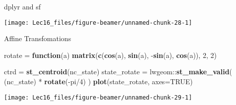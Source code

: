 \documentclass[11pt,ignorenonframetext,]{beamer}
\newenvironment{Shaded}{}{}
\newcommand{\ControlFlowTok}[1]{\textcolor[rgb]{0.00,0.44,0.13}{\textbf{#1}}}
\newcommand{\DataTypeTok}[1]{\textcolor[rgb]{0.56,0.13,0.00}{#1}}
\newcommand{\DecValTok}[1]{\textcolor[rgb]{0.25,0.63,0.44}{#1}}
\newcommand{\KeywordTok}[1]{\textcolor[rgb]{0.00,0.44,0.13}{\textbf{#1}}}
\newcommand{\NormalTok}[1]{#1}
\newcommand{\OperatorTok}[1]{\textcolor[rgb]{0.40,0.40,0.40}{#1}}
\newcommand{\OtherTok}[1]{\textcolor[rgb]{0.00,0.44,0.13}{#1}}
\newcommand{\StringTok}[1]{\textcolor[rgb]{0.25,0.44,0.63}{#1}}
\let\oldShaded\Shaded
\let\endoldShaded\endShaded
\renewenvironment{Shaded}{\footnotesize\begin{spacing}{0.9}\oldShaded}{\endoldShaded\end{spacing}}
\let\oldverbatim\verbatim
\let\endoldverbatim\endverbatim
\newcommand{\scriptoutput}{
  \renewenvironment{Shaded}{\scriptsize\begin{spacing}{0.9}\oldShaded}{\endoldShaded\end{spacing}}
  \renewenvironment{verbatim}{\scriptsize\begin{spacing}{0.9}\oldverbatim}{\endoldverbatim\end{spacing}}
}
\begin{document}
\begin{frame}[fragile,t]{dplyr and sf}
\protect\hypertarget{dplyr-and-sf}{}

\scriptoutput

\begin{Shaded}
\end{Shaded}

\begin{center}\texttt{[image: Lec16\_files/figure-beamer/unnamed-chunk-28-1]} \end{center}

\end{frame}

\begin{frame}[fragile,t]{Affine Transfomations}
\protect\hypertarget{affine-transfomations}{}

\scriptoutput

\begin{Shaded}
\begin{Highlighting}[]
\NormalTok{rotate =}\StringTok{ }\ControlFlowTok{function}\NormalTok{(a) }\KeywordTok{matrix}\NormalTok{(}\KeywordTok{c}\NormalTok{(}\KeywordTok{cos}\NormalTok{(a), }\KeywordTok{sin}\NormalTok{(a), }\OperatorTok{-}\KeywordTok{sin}\NormalTok{(a), }\KeywordTok{cos}\NormalTok{(a)), }\DecValTok{2}\NormalTok{, }\DecValTok{2}\NormalTok{)}

\NormalTok{ctrd =}\StringTok{ }\KeywordTok{st_centroid}\NormalTok{(nc_state)}
\NormalTok{state_rotate =}\StringTok{ }\NormalTok{lwgeom}\OperatorTok{::}\KeywordTok{st_make_valid}\NormalTok{( (nc_state) }\OperatorTok{*}\StringTok{ }\KeywordTok{rotate}\NormalTok{(}\OperatorTok{-}\NormalTok{pi}\OperatorTok{/}\DecValTok{4}\NormalTok{) )}
\KeywordTok{plot}\NormalTok{(state_rotate, }\DataTypeTok{axes=}\OtherTok{TRUE}\NormalTok{)}
\end{Highlighting}
\end{Shaded}

\begin{center}\texttt{[image: Lec16\_files/figure-beamer/unnamed-chunk-29-1]} \end{center}

\end{frame}
\end{document}
